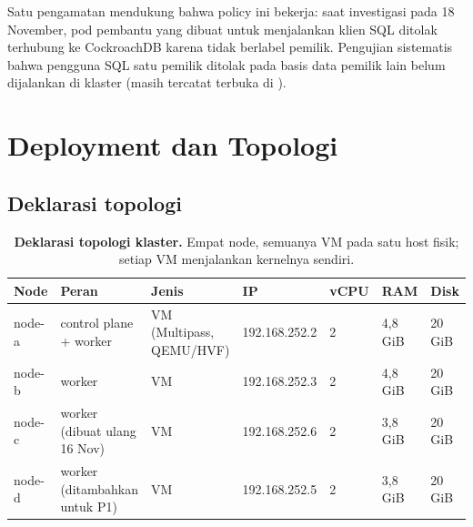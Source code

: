 \documentclass{fairmeta}
\begin{document}
Satu pengamatan mendukung bahwa policy ini bekerja: saat investigasi pada 18 November, pod pembantu yang dibuat untuk menjalankan klien SQL ditolak terhubung ke CockroachDB karena tidak berlabel pemilik. Pengujian sistematis bahwa pengguna SQL satu pemilik ditolak pada basis data pemilik lain belum dijalankan di klaster (masih tercatat terbuka di ).

\section{Deployment dan Topologi}
\label{sec:topology}

\subsection{Deklarasi topologi}

\begin{table}[htbp]
\centering
\caption{\textbf{Deklarasi topologi klaster.} Empat node, semuanya VM pada satu host fisik; setiap VM menjalankan kernelnya sendiri.}
\label{tab:topology}
\footnotesize
\begin{tabularx}{\textwidth}{@{}L{1.3cm}L{3.0cm}L{3.2cm}L{2.5cm}R{1.0cm}R{1.3cm}R{1.2cm}@{}}
\toprule
\textbf{Node} & \textbf{Peran} & \textbf{Jenis} & \textbf{IP} & \textbf{vCPU} & \textbf{RAM} & \textbf{Disk}\\
\midrule
node-a & control plane + worker & VM (Multipass, QEMU/HVF) & 192.168.252.2 & 2 & 4,8 GiB & 20 GiB\\
node-b & worker & VM & 192.168.252.3 & 2 & 4,8 GiB & 20 GiB\\
node-c & worker (dibuat ulang 16 Nov) & VM & 192.168.252.6 & 2 & 3,8 GiB & 20 GiB\\
node-d & worker (ditambahkan untuk P1) & VM & 192.168.252.5 & 2 & 3,8 GiB & 20 GiB\\
\bottomrule
\end{tabularx}
\end{table}
\end{document}
